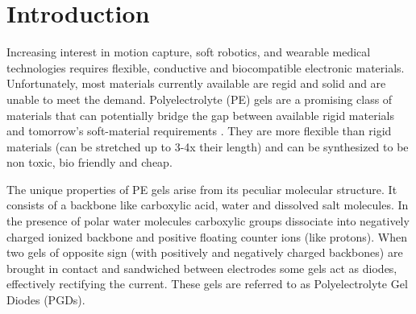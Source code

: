 \documentclass[twoside,twocolumn,9pt]{article}
\begin{document}






\section{Introduction}


Increasing interest in motion capture, soft robotics, and wearable medical technologies requires flexible, conductive and biocompatible electronic materials. Unfortunately, most materials currently available are regid and solid and are unable to meet the demand. Polyelectrolyte (PE) gels are a promising class of materials that can potentially bridge the gap between available rigid materials and tomorrow's soft-material requirements \cite{Huang2018BioinspiredBipolar,Han2009IonicMicrochip,Larson2016HighlySensing}. They are more flexible than rigid materials (can be stretched up to 3-4x their length) and can be synthesized to be non toxic, bio friendly and cheap.

The unique properties of PE gels arise from its peculiar molecular structure. It consists of a backbone like carboxylic acid, water and dissolved salt molecules. In the presence of polar water molecules carboxylic groups dissociate into negatively charged ionized backbone and positive floating counter ions (like protons). When two gels of opposite sign (with positively and negatively charged backbones) are brought in contact and sandwiched between electrodes some gels act as diodes, effectively  rectifying the current. These gels are referred to as Polyelectrolyte Gel Diodes (PGDs).
\end{document}
